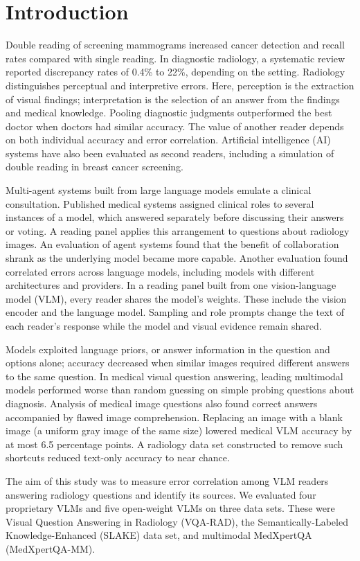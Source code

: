 \section{Introduction}

Double reading of screening mammograms increased cancer detection and recall rates compared with single reading.\cite{taylor2008double} In diagnostic radiology, a systematic review reported discrepancy rates of 0.4\% to 22\%, depending on the setting.\cite{geijer2018double} Radiology distinguishes perceptual and interpretive errors.\cite{bruno2015error} Here, perception is the extraction of visual findings; interpretation is the selection of an answer from the findings and medical knowledge. Pooling diagnostic judgments outperformed the best doctor when doctors had similar accuracy.\cite{kurvers2016pooling} The value of another reader depends on both individual accuracy and error correlation. Artificial intelligence (AI) systems have also been evaluated as second readers, including a simulation of double reading in breast cancer screening.\cite{mckinney2020breast}

Multi-agent systems built from large language models emulate a clinical consultation. Published medical systems assigned clinical roles to several instances of a model, which answered separately before discussing their answers or voting.\cite{kim2024mdagents,tang2024medagents} A reading panel applies this arrangement to questions about radiology images. An evaluation of agent systems found that the benefit of collaboration shrank as the underlying model became more capable.\cite{kim2026scaling} Another evaluation found correlated errors across language models, including models with different architectures and providers.\cite{correlated2025} In a reading panel built from one vision-language model (VLM), every reader shares the model's weights. These include the vision encoder and the language model. Sampling and role prompts change the text of each reader's response while the model and visual evidence remain shared.

Models exploited language priors, or answer information in the question and options alone; accuracy decreased when similar images required different answers to the same question.\cite{goyal2017vqa} In medical visual question answering, leading multimodal models performed worse than random guessing on simple probing questions about diagnosis.\cite{yan2025worse} Analysis of medical image questions also found correct answers accompanied by flawed image comprehension.\cite{jin2024hidden} Replacing an image with a blank image (a uniform gray image of the same size) lowered medical VLM accuracy by at most 6.5 percentage points.\cite{zafar2026see} A radiology data set constructed to remove such shortcuts reduced text-only accuracy to near chance.\cite{butsanets2026radimagenetvqa}

The aim of this study was to measure error correlation among VLM readers answering radiology questions and identify its sources. We evaluated four proprietary VLMs and five open-weight VLMs on three data sets. These were Visual Question Answering in Radiology (VQA-RAD), the Semantically-Labeled Knowledge-Enhanced (SLAKE) data set, and multimodal MedXpertQA (MedXpertQA-MM).\cite{lau2018vqarad,liu2021slake,zuo2025medxpertqa}
